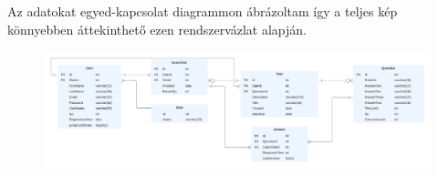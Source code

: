 




\label{Adatmodell}

Az adatokat egyed-kapcsolat diagrammon ábrázoltam így a teljes kép könnyebben áttekinthető ezen rendszervázlat alapján.

\begin{figure}[H]
    \centering
    \includegraphics[width=\linewidth]{images/TestME_ER.png}
\end{figure}

